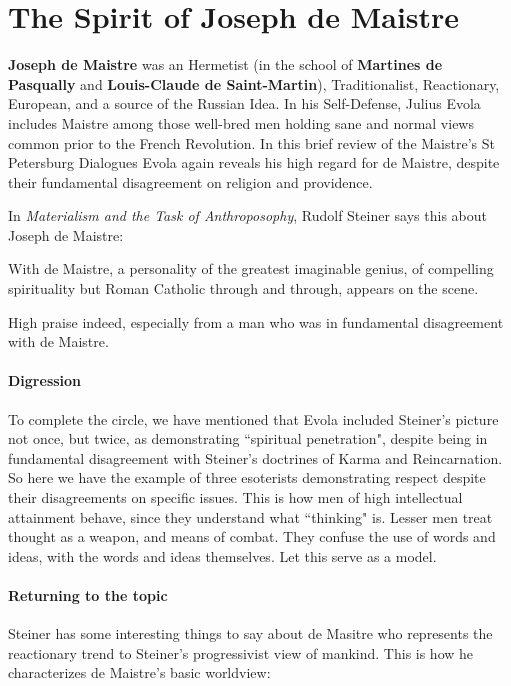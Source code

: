 \section{The Spirit of Joseph de Maistre}

\textbf{Joseph de Maistre} was an Hermetist (in the school of \textbf{Martines de Pasqually} and \textbf{Louis-Claude de Saint-Martin}), Traditionalist, Reactionary, European, and a source of the Russian Idea. In his Self-Defense, Julius Evola includes Maistre among those well-bred men holding sane and normal views common prior to the French Revolution. In this brief review of the Maistre's St Petersburg Dialogues Evola again reveals his high regard for de Maistre, despite their fundamental disagreement on religion and providence. 

In \textit{Materialism and the Task of Anthroposophy}, Rudolf Steiner says this about Joseph de Maistre:

\begin{quotex}
With de Maistre, a personality of the greatest imaginable genius, of compelling spirituality but Roman Catholic through and through, appears on the scene.

\end{quotex}
High praise indeed, especially from a man who was in fundamental disagreement with de Maistre.

\paragraph{Digression} To complete the circle, we have mentioned that Evola included Steiner's picture not once, but twice, as demonstrating ``spiritual penetration", despite being in fundamental disagreement with Steiner's doctrines of Karma and Reincarnation. So here we have the example of three esoterists demonstrating respect despite their disagreements on specific issues. This is how men of high intellectual attainment behave, since they understand what ``thinking" is. Lesser men treat thought as a weapon, and means of combat. They confuse the use of words and ideas, with the words and ideas themselves. Let this serve as a model.

\paragraph{Returning to the topic} Steiner has some interesting things to say about de Masitre who represents the reactionary trend to Steiner's progressivist view of mankind. This is how he characterizes de Maistre's basic worldview:

